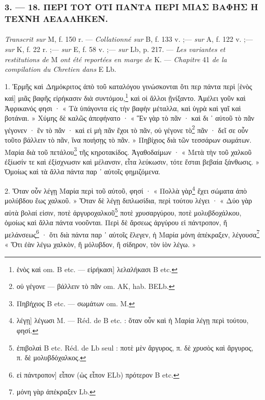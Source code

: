 \documentclass[a4paper, 11pt, oneside, polutonikogreek, french]{article}
\begin{document}
\subsubsection{3. --- 18. ΠΕΡΙ ΤΟΥ ΟΤΙ ΠΑΝΤΑ ΠΕΡΙ ΜΙΑΣ ΒΑΦΗΣ Η ΤΕΧΝΗ ΛΕΛΑΛΗΚΕΝ.}
\paragraph{}
\emph{Transcrit sur} M, f. 150 r. --- \emph{Collationné sur} B, f. 133 v. ;--- \emph{sur} A, f. 122 v. ;--- \emph{sur} K, f. 22 r. ;--- \emph{sur} E, f. 58 v. ;--- \emph{sur} Lb, p. 217. --- \emph{Les variantes et restitutions de} M \emph{ont été reportées en marge de} K. --- \emph{Chapitre} 41 \emph{de la compilation du Chretien dans} E Lb.

\bigskip

1. Ἑρμῆς καὶ Δημόκριτος ἀπὸ τοῦ καταλόγου γινώσκονται ὅτι περ πάντα περὶ [ἑνὸς καὶ] μιᾶς βαφῆς εἰρήκασιν διὰ συντόμου,\footnote{ἑνὸς καὶ om. B etc. --- εἰρήκασι] λελαλήκασι B etc.} καὶ οἱ ἄλλοι ῇνίξαντο. Ἀμέλει γοῦν καὶ Ἀφρικανός φησι · « Τὰ ὑπάγοντα εἰς τὴν βαφὴν μέταλλα, καὶ ὑγρὰ καὶ γαῖ καὶ βοτάναι. » Χύμης δὲ καλῶς ἀπεφήνατο · « Ἓν γὰρ τὸ πᾶν · καὶ δι ᾽ αὐτοῦ τὸ πᾶν γέγονεν · ἓν τὸ πᾶν · καὶ εἰ μὴ πᾶν ἔχοι τὸ πᾶν, οὐ γέγονε τὸ\footnote{οὐ γέγονε --- βάλλειν τὸ πᾶν om. AK, hab. BELb.} πᾶν · δεῖ σε οὖν τοῦτο βάλλειν τὸ πᾶν, ἵνα ποιήσῃς τὸ πᾶν. » Πηβίχιος διὰ τῶν τεσσάρων σωμάτων. Μαρία διὰ τοῦ πετάλου\footnote{Πηβήχιος B etc. --- σωμάτων om. M.} τῆς κηροτακίδος. Ἀγαθοδαίμων · « Μετὰ τὴν τοῦ χαλκοῦ ἐξίωσίν τε καὶ ἐξίσχνωσιν καὶ μέλανσιν, εἶτα λεύκωσιν, τότε ἔσται βεβαία ξάνθωσις. » Ὁμοίως καὶ τὰ ἄλλα πάντα παρ ᾽ αὐτοῖς φημιζόμενα.

2. Ὅταν οὖν λέγῃ Μαρία περὶ τοῦ αὐτοῦ, φησί · « Πολλὰ γὰρ\footnote{λέγῃ] λέγωσι M. --- Réd. de B etc. : ὅταν οὖν καὶ ἡ Μαρία λέγῃ περὶ τούτου, φησί.} ἔχει σώματα ἀπὸ μολύβδου ἕως χαλκοῦ. » Ὅταν δὲ λέγῃ διπλωσίδια, περὶ τούτου λέγει · « Δύο γὰρ αὐτὰ βολαί εἰσιν, ποτὲ ἀργυροχαλκοῦ\footnote{ἐπιβολαὶ B etc. Réd. de Lb seul : ποτὲ μὲν ἄργυρος, π. δὲ χρυσὸς καὶ ἄργυρος, π. δὲ μολυβδόχαλκος.} ποτὲ χρυσαργύρου, ποτὲ μολυβδοχάλκου, ὁμοίως καὶ ἄλλα πάντα νοοῦνται. Περὶ δὲ ἄρσεως ἀργύρου εἰ πάντροπον, ἤ μελάνσεως\footnote{εἰ πάντροπον] εἶπον (ὡς εἶπον ELb) πρότερον B etc.} · ὅτι διὰ πάντα παρ ᾽ αὐτοῖς ἔλεγεν, ἡ Μαρία μόνη ἀπέκραξεν, λέγουσα\footnote{μόνη γὰρ ἀπέκραξεν Lb.} « Ὅτι ἐὰν λέγω χαλκὸν, ἢ μόλυβδον, ἢ σίδηρον, τὸν ἰὸν λέγω. »

\bigskip
\centerline{\EightStarTaper}
\centerline{\EightStarTaper\EightStarTaper}
\bigskip
\end{document}
